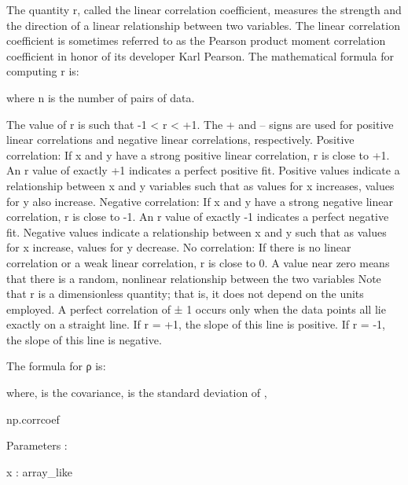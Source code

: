 The quantity r, called the linear correlation coefficient, measures the strength and 
      the direction of a linear relationship between two variables. The linear correlation
       coefficient is sometimes referred to as the Pearson product moment correlation coefficient in
       honor of its developer Karl Pearson.
   The mathematical formula for computing r is:
                             
                                   where n is the number of pairs of data.



The value of r is such that -1 < r < +1.  The + and – signs are used for positive
      linear correlations and negative linear correlations, respectively.  
   Positive correlation:    If x and y have a strong positive linear correlation, r is close
      to +1.  An r value of exactly +1 indicates a perfect positive fit.   Positive values
      indicate a relationship between x and y variables such that as values for x increases,
      values for  y also increase. 
   Negative correlation:   If x and y have a strong negative linear correlation, r is close
     to -1.  An r value of exactly -1 indicates a perfect negative fit.   Negative values
     indicate a relationship between x and y such that as values for x increase, values
     for y decrease. 
   No correlation:  If there is no linear correlation or a weak linear correlation, r is
     close to 0.  A value near zero means that there is a random, nonlinear relationship
     between the two variables
   Note that r is a dimensionless quantity; that is, it does not depend on the units 
     employed.
   A perfect correlation of ± 1 occurs only when the data points all lie exactly on a
     straight line.  If r = +1, the slope of this line is positive.  If r = -1, the slope of this
     line is negative.  






The formula for ρ is:
 
where, is the covariance, is the standard deviation of ,



np.corrcoef

Parameters :


x : array_like
 


